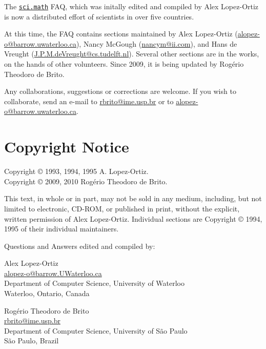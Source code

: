 The \href{news://sci.math}{\texttt{sci.math}} FAQ, which was initally
edited and compiled by Alex Lopez-Ortiz is now a distributed effort of
scientists in over five countries.

At this time, the FAQ contains sections maintained by Alex Lopez-Ortiz
(\url{alopez-o@barrow.uwaterloo.ca}), Nancy McGough
(\url{nancym@ii.com}), and Hans de Vreught
(\url{J.P.M.deVreught@cs.tudelft.nl}).  Several other sections are in
the works, on the hands of other volunteers. Since 2009, it is being
updated by Rogério Theodoro de Brito.

Any collaborations, suggestions or corrections are welcome. If you wish
to collaborate, send an e-mail to \url{rbrito@ime.usp.br} or to
\url{alopez-o@barrow.uwaterloo.ca}.

\section{Copyright Notice}

\noindent
Copyright © 1993, 1994, 1995 A. Lopez-Ortiz.\\
Copyright © 2009, 2010 Rogério Theodoro de Brito.

\bigskip

\noindent
This text, in whole or in part, may not be sold in any medium,
including, but not limited to electronic, CD-ROM, or published in print,
without the explicit, written permission of Alex Lopez-Ortiz.
Individual sections are Copyright © 1994, 1995 of their individual
maintainers.

\noindent Questions and Answers edited and compiled by:

\bigskip

\noindent
Alex Lopez-Ortiz\\
\url{alopez-o@barrow.UWaterloo.ca}\\
Department of Computer Science, University of Waterloo\\
Waterloo, Ontario, Canada

\medskip

\noindent
Rogério Theodoro de Brito\\
\url{rbrito@ime.usp.br}\\
Department of Computer Science, University of São Paulo\\
São Paulo, Brazil
